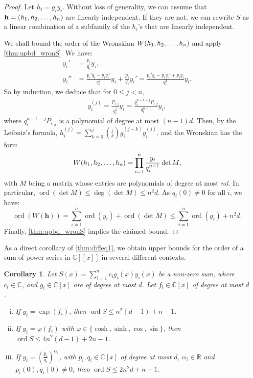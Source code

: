 \documentclass[a4paper, 11pt,dvipsnames]{article}
\newtheorem{corollary}{Corollary}
\newcommand\parc[1]{\left(#1\right)}
\newcommand{\ord}{\operatorname{ord}}
\begin{document}
	\diffeqorderboundthm*
  \begin{proof}
Let $h_i = g_iy_i$. Without loss of generality, we can assume that $\mathbf{h}=(h_{1},h_{2},\dots,h_{n})$ are linearly independent. If they are not, we can
    rewrite $S$ as a linear combination of a subfamily of the $h_i$'s that are linearly independent. 

    We shall bound the order of the Wronskian $W(h_{1},h_{2},\dots,h_{n})$ and apply \cref{thm:upbd_wronS}.  We have: \begin{align*} y_i' &= \frac{p_i}{q_i}y_i, \\ y_i'' &=
      \frac{p_i'q_i - p_iq_i'}{q_i^2}y_i + \frac{p_i}{q_i}y_i' = \frac{p_i'q_i - p_iq_i'+ p_iq_i}{q_i^2}y_i.  \end{align*} So by induction, we deduce that for $0
      \le j < n$, \begin{align*} y_i^{(j)} = \frac{P_{i,j}}{q_i^j}y_i = \frac{q_i^{n-1-j}P_{i,j}}{q_i^{n-1}}y_i , \end{align*} where $q_i^{n-1 -j}P_{i,j}$ is a
      polynomial of degree at most $(n-1)d$.  Then, by the Leibniz's formula, $h_i^{(j)} = \sum_{k=0}^j \binom{j}{k}g_i^{(j-k)}y_i^{(j)}$, and the Wronskian has
      the form \begin{align*} W(h_{1},h_{2},\dots,h_{n})    = \prod_{i=1}^n \frac{y_i}{q_i^{n-1}}\det M, \end{align*} with $M$ being a matrix whose entries are polynomials of
      degree at most $nd$. In particular, $\ord(\det M) \le \deg(\det M) \le n^2d$.      As $q_i(0) \neq 0$ for all $i$, we have: \begin{equation*} \ord (W(\mathbf{h})) = \sum_{i=1}^n \ord(y_i) + \ord(\det M) \le  \sum_{i=1}^n \ord(y_i) +
      n^2d.  \end{equation*} Finally, \cref{thm:upbd_wronS} implies the claimed bound.  \end{proof}

      As a direct corollary of \cref{thm:diffeq1}, we obtain upper bounds for the order of a sum of power series in $\mathbb{C}[[x]]$ in several different contexts. 

\begin{corollary} \label{coro:exp_proot_etc} Let $S(x) = \sum_{i=1}^n c_i g_i(x) y_i(x)$ be a non-zero sum, where $c_i \in \mathbb{C}$, and $g_i \in \mathbb{C}[x]$ are of degree at most $d$. Let $f_i \in \mathbb{C}[x]$ of degree at most $d$. 
\begin{enumerate}[(i)]
  \item \label{it:exp}If $y_i = \exp(f_i)$, then $\ord S \le n^2(d-1) + n-1$. 
        \item \label{it:sincos} If $y_i = \varphi(f_i)$ with $\varphi \in \{\cosh,\sinh, \cos , \sin\}$, then $\ord S \le 4n^2(d-1) + 2n-1$.  
        \item \label{it:rationalrealpower} If $y_i = \parc{\frac{p_i}{q_i}}^{\alpha_i}$, with $p_i, q_i \in \mathbb{C}[x]$ of degree at most $d$, $\alpha_i \in \mathbb{R}$ and $p_i(0), q_i(0) \neq 0$, then $\ord S
  \le 2 n^2 d + n -1$.  
\end{enumerate}
\end{corollary}
\end{document}
